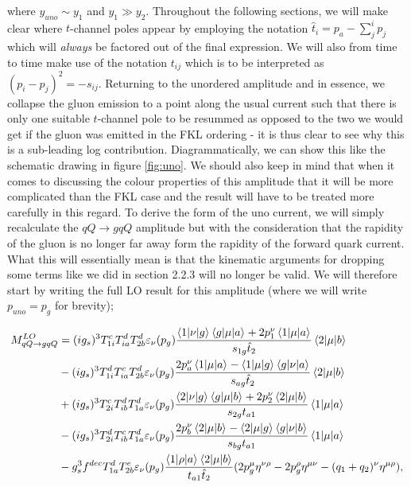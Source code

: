 where $y_{uno} \sim y_1$ and $y_1 \gg y_2$. Throughout the following sections, we will make clear where $t$-channel poles appear by employing the notation $\hat{t}_i = p_a - \sum_j^i p_j$ which will \emph{always} be factored out of the final expression. We will also from time to time make use of the notation $t_{ij}$ which is to be interpreted as $(p_i-p_j)^2 = -s_{ij}$.  Returning to the unordered amplitude and in essence, we collapse the gluon emission to a point along the usual current such that there is only one suitable $t$-channel pole to be resummed as opposed to the two we would get if the gluon was emitted in the FKL ordering - it is thus clear to see why this is a sub-leading log contribution. Diagrammatically, we can show this like the schematic drawing in figure \ref{fig:uno}. We should also keep in mind that when it comes to discussing the colour properties of this amplitude that it will be more complicated than the FKL case and the result will have to be treated more carefully in this regard. To derive the form of the uno current, we will simply recalculate the $qQ \to gqQ$ amplitude but with the consideration that the rapidity of the gluon is no longer far away form the rapidity of the forward quark current. What this will essentially mean is that the kinematic arguments for dropping some terms like we did in section 2.2.3 will no longer be valid. We will therefore start by writing the full LO result for this amplitude (where we will write $p_{uno} = p_g$ for brevity);

\begin{equation}
\begin{split}
M_{qQ \to gqQ}^{LO} &= (ig_s)^3 T^c_{1i}T_{ia}^d T^d_{2b} \varepsilon_{\nu}(p_g) \frac{\mathinner{\langle1\vert\nu\vert g\rangle}_{}\mathinner{\langle g\vert\mu\vert a\rangle}_{} + 2p_1^\nu \mathinner{\langle1\vert\mu\vert a\rangle}_{}}{s_{1g}\hat{t}_2}\mathinner{\langle2\vert\mu\vert b\rangle}_{} \\
 &- (ig_s)^3 T^d_{1i}T_{ia}^c T^d_{2b} \varepsilon_{\nu}(p_g) \frac{2p_a^\nu \mathinner{\langle1\vert\mu\vert a\rangle}_{} - \mathinner{\langle1\vert\mu\vert g\rangle}_{}\mathinner{\langle g\vert\nu\vert a\rangle}_{}}{s_{ag}\hat{t}_2}\mathinner{\langle2\vert\mu\vert b\rangle}_{} \\
 &+ (ig_s)^3 T^c_{2i}T_{ib}^d T^d_{1a} \varepsilon_{\nu}(p_g) \frac{\mathinner{\langle2\vert\nu\vert g\rangle}_{}\mathinner{\langle g\vert\mu\vert b\rangle}_{} + 2p_2^\nu \mathinner{\langle2\vert\mu\vert b\rangle}_{}}{s_{2g}t_{a1}}\mathinner{\langle1\vert\mu\vert a\rangle}_{} \\
  &- (ig_s)^3 T^d_{2i}T_{ib}^c T^d_{1a} \varepsilon_{\nu}(p_g) \frac{2p_b^\nu \mathinner{\langle2\vert\mu\vert b\rangle}_{} - \mathinner{\langle2\vert\mu\vert g\rangle}_{}\mathinner{\langle g\vert\nu\vert b\rangle}_{}}{s_{bg}t_{a1}}\mathinner{\langle1\vert\mu\vert a\rangle}_{} \\
  &-g_s^3 f^{dec}T^d_{1a}T^e_{2b} \varepsilon_\nu(p_g) \frac{\mathinner{\langle1\vert\rho\vert a\rangle}_{}\mathinner{\langle2\vert\mu\vert b\rangle}_{}}{t_{a1} \hat{t}_2}(2p_g^\mu \eta^{\nu \rho} - 2p_g^\rho \eta^{\mu \nu} - (q_1 + q_2)^\nu \eta^{\mu \rho}),
\end{split}
\end{equation}

